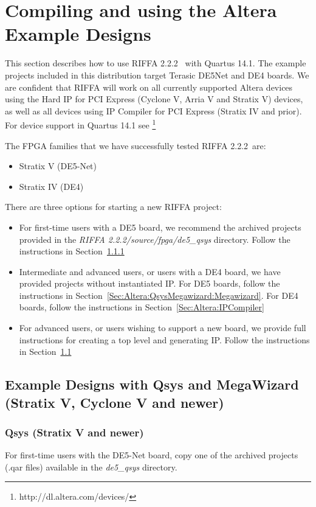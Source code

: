 \documentclass{refrep}
\newcommand{\QuartusVer}{14.1}
\newcommand{\RIFFAVer}{2.2.2}
\newcommand{\Directory}[1]{\textit{#1}}
\begin{document}
\pagebreak
\chapter{Compiling and using the Altera Example Designs}
\label{Chap:Altera}
This section describes how to use RIFFA \RIFFAVer~ with Quartus \QuartusVer. The
example projects included in this distribution target Terasic DE5Net and DE4
boards. We are confident that RIFFA will work on all currently supported Altera
devices using the Hard IP for PCI Express (Cyclone V, Arria V and Stratix V)
devices, as well as all devices using IP Compiler for PCI Express (Stratix IV
and prior). For device support in Quartus \QuartusVer
see \footnote{http://dl.altera.com/devices/}

The FPGA families that we have successfully tested RIFFA \RIFFAVer~are:
\begin{itemize}
\item Stratix V (DE5-Net)
\item Stratix IV (DE4)
\end{itemize}
There are three options for starting a new RIFFA project:
\begin{itemize}
\item For first-time users with a DE5 board, we recommend the archived projects
  provided in the \Directory{RIFFA \RIFFAVer/source/fpga/de5\_qsys} directory. Follow the
  instructions in Section~\ref{Sec:Altera:QsysMegawizard:Qsys}
\item Intermediate and advanced users, or users with a DE4 board, we have
  provided projects without instantiated IP. For DE5 boards, follow the
  instructions in Section~\ref{Sec:Altera:QsysMegawizard:Megawizard}. For DE4 boards, follow
  the instructions in Section~\ref{Sec:Altera:IPCompiler}
\item For advanced users, or users wishing to support a new board, we provide
  full instructions for creating a top level and generating IP. Follow the
  instructions in Section~\ref{Sec:Altera:QsysMegawizard}
\end{itemize}

\section{Example Designs with Qsys and MegaWizard (Stratix V, Cyclone V and newer)}
\label{Sec:Altera:QsysMegawizard}
\subsection{Qsys (Stratix V and newer)}
\label{Sec:Altera:QsysMegawizard:Qsys}
For first-time users with the DE5-Net board, copy one of the archived projects
(.qar files) available in the \Directory{de5\_qsys} directory.
\end{document}
